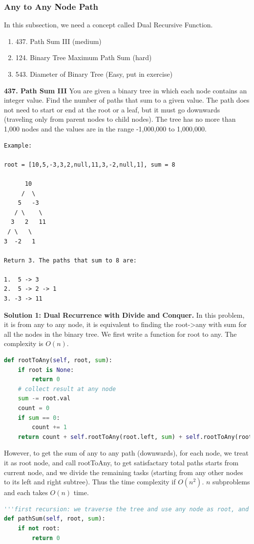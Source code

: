 \documentclass[../main.tex]{subfiles}
\begin{document}
\subsubsection{Any to Any Node Path}
In this subsection, we need a concept called Dual Recursive Function. 
\begin{enumerate}
    \item 437. Path Sum III (medium)
    \item 124. Binary Tree Maximum Path Sum (hard)
    \item 543. Diameter of Binary Tree (Easy, put in exercise)
\end{enumerate}
\begin{examples}[resume]
\item \textbf{437. Path Sum III} You are given a binary tree in which each node contains an integer value. Find the number of paths that sum to a given value. The path does not need to start or end at the root or a leaf, but it must go downwards (traveling only from parent nodes to child nodes). The tree has no more than 1,000 nodes and the values are in the range -1,000,000 to 1,000,000.
\begin{lstlisting}[numbers=none]
Example:

root = [10,5,-3,3,2,null,11,3,-2,null,1], sum = 8

      10
     /  \
    5   -3
   / \    \
  3   2   11
 / \   \
3  -2   1

Return 3. The paths that sum to 8 are:

1.  5 -> 3
2.  5 -> 2 -> 1
3. -3 -> 11
\end{lstlisting}
\textbf{Solution 1: Dual Recurrence with Divide and Conquer.} In this problem, it is from any to any node, it is equivalent to finding the root->any with sum for all the nodes in the binary tree. We first write a function for root to any. The complexity is $O(n)$. 
\begin{lstlisting}[language = Python]
def rootToAny(self, root, sum):
    if root is None: 
        return 0
    # collect result at any node
    sum -= root.val
    count = 0
    if sum == 0:
        count += 1
    return count + self.rootToAny(root.left, sum) + self.rootToAny(root.right, sum)
\end{lstlisting}
However, to get the sum of any to any path (downwards),  for each node, we treat it as root node, and call rootToAny, to get satisfactary total paths starts from current node, and we divide the remaining tasks (starting from any other nodes to its left and right subtree).  Thus the time complexity if $O(n^2)$. $n$ subproblems and each takes $O(n)$ time.
\begin{lstlisting}[language = Python]
   '''first recursion: we traverse the tree and use any node as root, and call rootToAny to get its paths'''
def pathSum(self, root, sum):
    if not root:
        return 0


\end{lstlisting}
\end{examples}
\end{document}

